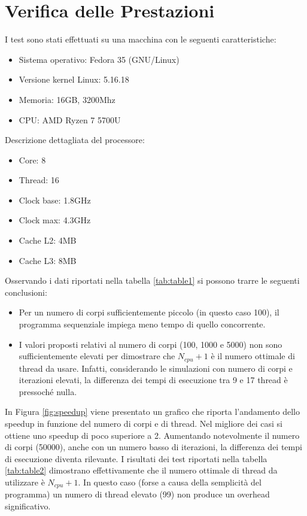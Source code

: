 \documentclass[12pt,a4paper,openright,twoside]{book}
\begin{document}
\chapter{Verifica delle Prestazioni} %
\label{chap:Verifica delle Prestazioni}

I test sono stati effettuati su una macchina con le seguenti caratteristiche:
\begin{itemize}
	\item Sistema operativo: Fedora 35 (GNU/Linux)
	\item Versione kernel Linux: 5.16.18
	\item Memoria: 16GB, 3200Mhz
	\item CPU: AMD Ryzen 7 5700U
\end{itemize}
Descrizione dettagliata del processore:
\begin{itemize}
	\item Core: 8
	\item Thread: 16
	\item Clock base: 1.8GHz
	\item Clock max: 4.3GHz
	\item Cache L2: 4MB
	\item Cache L3: 8MB
\end{itemize}

Osservando i dati riportati nella tabella \ref{tab:table1}
si possono trarre le seguenti conclusioni:
\begin{itemize}
	\item Per un numero di corpi sufficientemente piccolo (in questo caso 100),
	il programma sequenziale impiega meno tempo di quello concorrente.
	\item I valori proposti relativi al numero di corpi (100, 1000 e 5000) non sono sufficientemente elevati per
	dimostrare che $N_{cpu}+1$ è il numero ottimale di thread da usare. Infatti, considerando
	le simulazioni con numero di corpi e iterazioni elevati, la differenza dei tempi di esecuzione tra 9 e 17 thread è pressoché nulla.
\end{itemize}

In Figura \ref{fig:speedup} viene presentato un grafico che riporta l'andamento dello speedup in funzione del numero di corpi e di thread.
Nel migliore dei casi si ottiene uno speedup di poco superiore a 2.
Aumentando notevolmente il numero di corpi (50000), anche con un numero basso di iterazioni,
la differenza dei tempi di esecuzione diventa rilevante.
I risultati dei test riportati nella tabella \ref{tab:table2} dimostrano effettivamente che
il numero ottimale di thread da utilizzare è $N_{cpu} + 1$. In questo caso (forse a causa della semplicità del programma)
un numero di thread elevato (99) non produce un overhead significativo.
\end{document}
